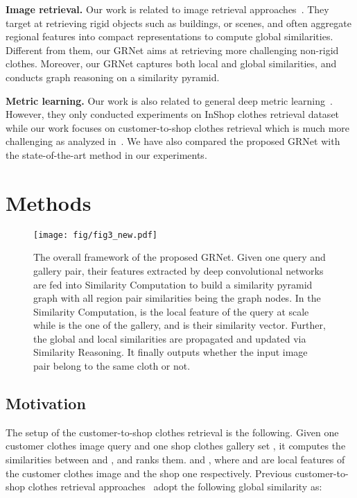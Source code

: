 \documentclass[10pt,twocolumn,letterpaper]{article}
\begin{document}
\textbf{Image retrieval.} Our work is related to image retrieval approaches~\cite{noh2016large,gordo2016end,Arandjelovic16,radenovic2016cnn,gordo2016deep,tolias2015particular,Yandex2016,chen2017acmmm,chen2019acmmm}.
They target at retrieving rigid objects such as buildings, or scenes,
and often aggregate regional features  into compact representations to compute global similarities.
Different from them, our GRNet aims at retrieving more challenging non-rigid clothes. Moreover, our GRNet captures both local and global similarities, and conducts graph reasoning on a similarity pyramid.

\textbf{Metric learning.} Our work is also related to general deep metric learning~\cite{Opitz2017a, Yuan2017,Kim2018,Opitz2017,Xuan2018}. However, they only conducted experiments on InShop clothes retrieval dataset while our work focuses on customer-to-shop clothes retrieval which is much more challenging as analyzed in~\cite{Liu2016}. We have also compared the proposed GRNet with the state-of-the-art method \cite{Xuan2018} in our experiments.

\section{Methods}

\begin{figure*}[t]
\centering
  \texttt{[image: fig/fig3\_new.pdf]}
\caption{The overall framework of the proposed GRNet. Given one query and gallery pair,
their features extracted by deep convolutional networks are fed into Similarity Computation to build a similarity pyramid graph with all region pair similarities being the graph nodes.
In the Similarity Computation,  is the  local feature of the query at scale  while   is the  one of the gallery, and  is their similarity vector.
Further, the global and local similarities are propagated and updated via Similarity Reasoning.
It finally outputs whether the input image pair belong to the same cloth or not.}
\label{fig:framework}
\vspace{-2mm}
\end{figure*}



\subsection{Motivation}
The setup of the customer-to-shop clothes retrieval is the following. Given one customer clothes image query  and one shop clothes gallery set , it computes the similarities  between  and , and ranks them.  and , where  and  are local features of the customer clothes image and the shop one respectively. Previous customer-to-shop clothes retrieval approaches~\cite{Huang2015,Kiapour2015,Liu2016,Ji2017,Song2017,Corbiere2017,Garcia2017,Cheng2017,Zhang2018}  adopt the following global similarity as:
\end{document}
